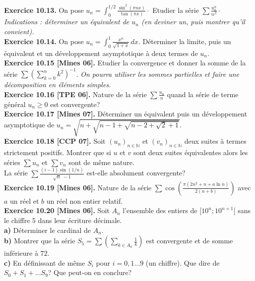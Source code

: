 \documentclass[a4paper,12pt,francais]{article}
\newcommand{\field}[1]{\mathbb{#1}}
\newcommand{\N}{\field{N}}
\begin{document}
\noindent
{\bf Exercice 10.13.} On pose $\displaystyle u_n=\int_0^{1/2}
\frac{\sin^2(\pi n x)}{\tan(\pi x)}\cdot$ Etudier la série
$\displaystyle \sum \frac{u_n^\alpha}{n^\beta}\cdot$\\
{\it Indications : déterminer un équivalent de $u_n$ (en deviner un,
  puis montrer qu'il convient).}\\

\noindent
{\bf Exercice 10.14.} On pose $\displaystyle u_n=\int_0^1 \frac{x^n}{\sqrt{1+x}} \,dx.$
Déterminer la limite, puis un équivalent et un développement
asymptotique à deux termes de $u_n$.\\ 

\noindent
    {\bf Exercice 10.15 [Mines 06].} Etudier la convergence et donner
    la somme de la série $\displaystyle \sum \left( \sum_{k=0}^n k^2 \right) ^{-1}$.
{\it On pourra utiliser les sommes partielles et faire une
    décomposition en éléments simples}.\\

\noindent
{\bf Exercice 10.16 [TPE 06].} Nature de la série $\sum \frac{u_n}{n}$
quand la série de terme général $u_n\geqslant 0$ est convergente?\\

\noindent
{\bf Exercice 10.17 [Mines 07].} Déterminer un équivalent puis un développement asymptotique de $u_n=\sqrt{n+\sqrt{n-1+\sqrt{n-2+\sqrt{2}+1}}}$.\\

\noindent
{\bf Exercice 10.18 [CCP 07].} Soit $(u_n)_{n\in \N}$ et $(v_n)_{n\in \N}$ deux suites à termes strictement positifs. Montrer que si $u$ et $v$ sont deux suites équivalentes alors les séries $\sum u_n$ et $\sum v_n$ sont de même nature.\\
La série $\displaystyle \sum \frac{(i-1) \sin (1/n)}{\sqrt{n}\; -1}$ est-elle absolument convergente?\\

\noindent
{\bf Exercice 10.19 [Mines 06].} Nature de la série $\displaystyle \sum \cos \left( \frac{\pi (2n^2+n+a \ln n)}{2(n+b)} \right) $ avec $a$ un réel et $b$ un réel non entier relatif.\\

\noindent
{\bf Exercice 10.20 [Mines 06].} Soit $A_n$ l'ensemble des entiers de $[10^n;10^{n+1}[$ sans le chiffre $5$ dans leur écriture décimale.\\
\indent
{\bf a)} Déterminer le cardinal de $A_n$.\\
\indent
{\bf b)} Montrer que la série $S_5=\sum \left( \sum_{k \in A_n} \frac{1}{k} \right)$ est convergente et de somme inférieure à $72$.\\
\indent
{\bf c)} En définissant de même $S_i$ pour $i=0,1...9$ (un chiffre). Que dire de $S_0+S_1+...S_9$? Que peut-on en conclure?\\
\end{document}
